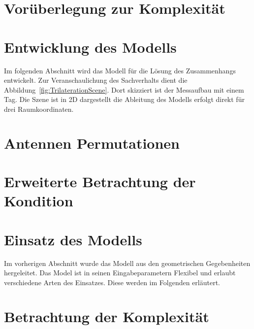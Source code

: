 \section{Vorüberlegung zur Komplexität}
\label{sec:Komplexity1}

%
\section{Entwicklung des Modells}
\label{sec:model_developement}
Im folgenden Abschnitt wird das Modell für die Lösung des Zusammenhangs entwickelt. Zur Veranschaulichung des Sachverhalts dient die Abbildung~\ref{fig:TrilaterationScene}. Dort skizziert ist der Messaufbau mit einem Tag. Die Szene ist in 2D dargestellt die Ableitung des Modells erfolgt direkt für drei Raumkoordinaten.
%

%
\section{Antennen Permutationen}

%
\section{Erweiterte Betrachtung der Kondition}
%

%
\section{Einsatz des Modells}
\label{sec:use_of_model}
Im vorherigen Abschnitt wurde das Modell aus den geometrischen Gegebenheiten hergeleitet. Das Model ist in seinen Eingabeparametern Flexibel und erlaubt verschiedene Arten des Einsatzes. Diese werden im Folgenden erläutert.
%

%
\section{Betrachtung der Komplexität}
\label{sec:Komplexity2}

%
